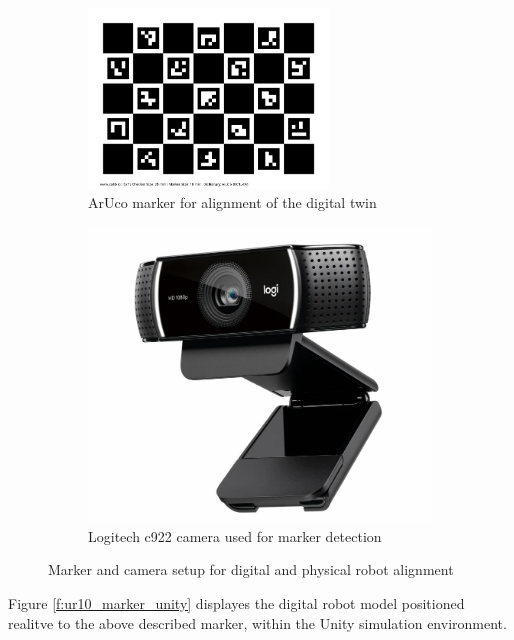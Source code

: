 \begin{figure}[h]
    \centering
    \begin{subfigure}[b]{0.45\textwidth}
    \centering
    \includegraphics[width=0.7\textwidth]{figs/calib_io_charuco_200x150_5x7_25_18_DICT_4X4.png}
    \caption{ArUco marker for alignment of the digital twin}
    \label{f:aruco_marker}
    \end{subfigure}
        \hfill
    \begin{subfigure}[b]{0.45\textwidth}
        \centering
        \includegraphics[width=0.7\linewidth]{figs/camera-c922.jpg}
        \caption{Logitech c922 camera used for marker detection}
        \label{fig:camera-c922}
    \end{subfigure}
    \caption{Marker and camera setup for digital and physical robot alignment}
\label{marker-camera}
\end{figure}

Figure \ref{f:ur10_marker_unity} displayes the digital robot model positioned realitve to the above described marker, within the Unity simulation environment.

